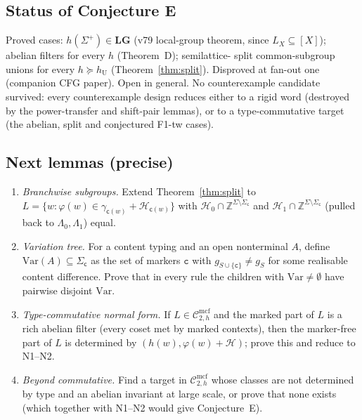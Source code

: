 \documentclass[11pt]{article}
\theoremstyle{definition}
\theoremstyle{remark}
\newcommand{\Cmcf}[2]{\mathcal{C}^{\mathrm{mcf}}_{#1,#2}}
\newcommand{\Z}{\mathbb Z}
\newcommand{\mk}{\mathsf c}
\begin{document}
\subsection{Status of Conjecture E}
Proved cases: $h(\Sigma^+)\in\mathbf{LG}$ (v79 local-group theorem, since
$L_X\subseteq[X]$); abelian filters for every $h$ (Theorem~D); semilattice-
split common-subgroup unions for every $h\succeq h_{\mathrm U}$
(Theorem~\ref{thm:split}).  Disproved at fan-out one (companion CFG
paper).  Open in general.  No counterexample candidate survived: every
counterexample design reduces either to a rigid word (destroyed by the
power-transfer and shift-pair lemmas), or to a type-commutative target
(the abelian, split and conjectured F1-tw cases).

\subsection{Next lemmas (precise)}
\begin{enumerate}[label=(N\arabic*)]
\item \emph{Branchwise subgroups.}  Extend Theorem~\ref{thm:split} to
$L=\{w:\varphi(w)\in\gamma_{\mk(w)}+\mathcal H_{\mk(w)}\}$ with
$\mathcal H_0\cap\Z^{\Sigma\setminus\Sigma_{\mk}}$ and
$\mathcal H_1\cap\Z^{\Sigma\setminus\Sigma_{\mk}}$ (pulled back to
$\Lambda_0,\Lambda_1$) equal.
\item \emph{Variation tree.}  For a content typing and an open
nonterminal $A$, define $\mathrm{Var}(A)\subseteq\Sigma_{\mk}$ as the set of
markers $\mathtt c$ with $g_{S\cup\{\mathtt c\}}\neq g_S$ for some
realisable content difference.  Prove that in every rule the children with
$\mathrm{Var}\neq\emptyset$ have pairwise disjoint $\mathrm{Var}$.
\item \emph{Type-commutative normal form.}  If $L\in\Cmcf{2}{h}$ and the
marked part of $L$ is a rich abelian filter (every coset met by marked
contexts), then the marker-free part of $L$ is determined by
$(h(w),\varphi(w)+\mathcal H)$; prove this and reduce to N1--N2.
\item \emph{Beyond commutative.}  Find a target in $\Cmcf{2}{h}$ whose
classes are not determined by type and an abelian invariant at large
scale, or prove that none exists (which together with N1--N2 would give
Conjecture~E).
\end{enumerate}
\end{document}
